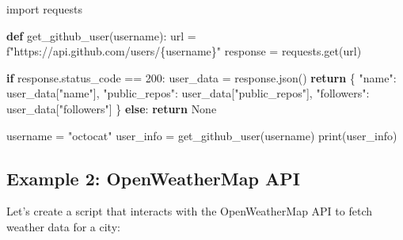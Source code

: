 \documentclass[
  letterpaper,
  DIV=11,
  numbers=noendperiod]{scrreprt}
\newenvironment{Shaded}{\begin{snugshade}}{\end{snugshade}}
\newcommand{\BuiltInTok}[1]{\textcolor[rgb]{0.00,0.23,0.31}{#1}}
\newcommand{\ControlFlowTok}[1]{\textcolor[rgb]{0.00,0.23,0.31}{\textbf{#1}}}
\newcommand{\DecValTok}[1]{\textcolor[rgb]{0.68,0.00,0.00}{#1}}
\newcommand{\ImportTok}[1]{\textcolor[rgb]{0.00,0.46,0.62}{#1}}
\newcommand{\KeywordTok}[1]{\textcolor[rgb]{0.00,0.23,0.31}{\textbf{#1}}}
\newcommand{\NormalTok}[1]{\textcolor[rgb]{0.00,0.23,0.31}{#1}}
\newcommand{\OperatorTok}[1]{\textcolor[rgb]{0.37,0.37,0.37}{#1}}
\newcommand{\SpecialCharTok}[1]{\textcolor[rgb]{0.37,0.37,0.37}{#1}}
\newcommand{\SpecialStringTok}[1]{\textcolor[rgb]{0.13,0.47,0.30}{#1}}
\newcommand{\StringTok}[1]{\textcolor[rgb]{0.13,0.47,0.30}{#1}}
\newcommand{\VariableTok}[1]{\textcolor[rgb]{0.07,0.07,0.07}{#1}}
\begin{document}
\begin{Shaded}
\begin{Highlighting}[]
\ImportTok{import}\NormalTok{ requests}

\KeywordTok{def}\NormalTok{ get\_github\_user(username):}
\NormalTok{    url }\OperatorTok{=} \SpecialStringTok{f"https://api.github.com/users/}\SpecialCharTok{\{}\NormalTok{username}\SpecialCharTok{\}}\SpecialStringTok{"}
\NormalTok{    response }\OperatorTok{=}\NormalTok{ requests.get(url)}
    
    \ControlFlowTok{if}\NormalTok{ response.status\_code }\OperatorTok{==} \DecValTok{200}\NormalTok{:}
\NormalTok{        user\_data }\OperatorTok{=}\NormalTok{ response.json()}
        \ControlFlowTok{return}\NormalTok{ \{}
            \StringTok{"name"}\NormalTok{: user\_data[}\StringTok{"name"}\NormalTok{],}
            \StringTok{"public\_repos"}\NormalTok{: user\_data[}\StringTok{"public\_repos"}\NormalTok{],}
            \StringTok{"followers"}\NormalTok{: user\_data[}\StringTok{"followers"}\NormalTok{]}
\NormalTok{        \}}
    \ControlFlowTok{else}\NormalTok{:}
        \ControlFlowTok{return} \VariableTok{None}

\NormalTok{username }\OperatorTok{=} \StringTok{"octocat"}
\NormalTok{user\_info }\OperatorTok{=}\NormalTok{ get\_github\_user(username)}
\BuiltInTok{print}\NormalTok{(user\_info)}
\end{Highlighting}
\end{Shaded}

\subsection{Example 2: OpenWeatherMap
API}\label{example-2-openweathermap-api}

Let's create a script that interacts with the OpenWeatherMap API to
fetch weather data for a city:
\end{document}
